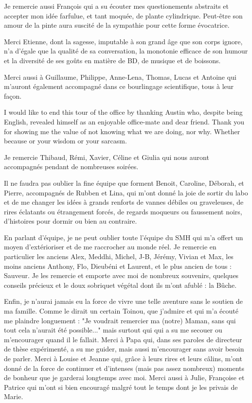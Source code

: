 \documentclass[a4paper, notoc, justified,marginals=left, nobib]{tufte-book}
\begin{document}
\begin{fullwidth}
Je remercie aussi François qui a su écouter mes questionements abstraits et accepter mon idée farfulue, et tant moquée, de plante cylindrique. Peut-être son amour de la pinte aura suscité de la sympathie pour cette forme évocatrice.

Merci Etienne, dont la sagesse, imputable à son grand âge que son corps ignore, n'a d'égale que la qualité de sa conversation, la monotonie efficace de son humour et la diversité de ses go\^uts en matière de BD, de musique et de boissons.

Merci aussi à Guillaume, Philippe, Anne-Lena, Thomas, Lucas et Antoine qui m'auront également accompagné dans ce bourlingage scientifique, tous à leur façon.

I would like to end this tour of the office by thanking Austin who, despite being English, revealed himself as an enjoyable office-mate and dear friend. Thank you for showing me the value of not knowing what we are doing, nor why. Whether because or your wisdom or your sarcasm.

Je remercie Thibaud, Rémi, Xavier, Céline et Giulia qui  nous auront accompagnés pendant de nombreuses soirées.

Il ne faudra pas oublier la fine équipe que forment Benoit, Caroline, Déborah, et Pierre, accompagnés de Rubben et Lina, qui m'ont donné la joie de sortir du labo et de me changer les idées à grands renforts de vannes débiles ou graveleuses, de rires éclatants ou étrangement forcés, de regards moqueurs ou faussement noirs, d'histoires pour dormir ou bien au contraire.

En parlant d'équipe, je ne peut oublier toute l'équipe du SMH qui m'a offert un moyen d'extérioriser et de me raccrocher au monde réel. Je remercie en particulier les anciens Alex, Meddhi, Michel, J-B, Jérémy, Vivian et Max, les moins anciens Anthony, Flo, Dieubéni et Laurent, et le plus ancien de tous : Sauveur. Je les remercie et emporte avec moi de nombreux souvenirs, quelques conseils précieux et le doux sobriquet végétal dont ils m'ont afublé : la Bûche.

\vspace{0.5cm}

Enfin, je n'aurai jamais eu la force de vivre une telle aventure sans le soutien de ma famille. Comme le dirait un certain Toinou, que j'admire et qui m'a écouté me plaindre longuement : "Je voudrait remercier ma (notre) Maman, sans qui tout cela n'aurait été possible..." mais  surtout qui qui a su me secouer ou m'encourager quand il le fallait. Merci à Papa qui, dans ses paroles de directeur de thèse expérimenté, a su me guider, mais aussi m'encourager sans avoir besoin de parler. Merci à Louise et Jeanne qui, grâce à leurs rires et leurs câlins, m'ont donné de la force de continuer et d'intenses (mais pas assez nombreux) moments de bonheur que je garderai longtemps avec moi. Merci aussi à Julie, Françoise et Patrice qui m'ont si bien encouragé malgré tout le temps dont je les privais de Marie.


\end{fullwidth}
\end{document}
